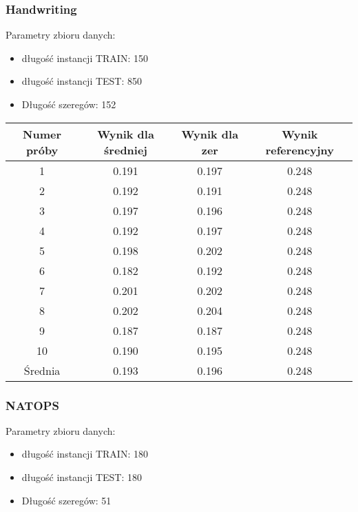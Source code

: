 \documentclass[12pt]{article}
\begin{document}
\subsubsection*{Handwriting}
Parametry zbioru danych:
\begin{itemize}
  \item długość instancji TRAIN: 150
  \item długość instancji TEST: 850
  \item Długość szeregów: 152
\end{itemize}

\begin{center}
\begin{tabular}{|c c c c|} 
 \hline
 Numer próby & Wynik dla średniej & Wynik dla zer & Wynik referencyjny \\ [0.5ex] 
 \hline\hline
 1 & 0.191 & 0.197 & 0.248 \\ 
 \hline
 2 & 0.192 & 0.191 & 0.248 \\
 \hline
 3 & 0.197 & 0.196 & 0.248 \\
 \hline
 4 & 0.192 & 0.197 & 0.248 \\
 \hline
  5 & 0.198 & 0.202 & 0.248 \\
 \hline
  6 & 0.182 & 0.192 & 0.248 \\
 \hline
  7 & 0.201 & 0.202 & 0.248 \\
 \hline
  8 & 0.202 & 0.204 & 0.248 \\
 \hline
  9 & 0.187 & 0.187 & 0.248 \\
 \hline
  10 & 0.190 & 0.195 & 0.248 \\
 \hline
 Średnia & 0.193 & 0.196 & 0.248 \\
 \hline
\end{tabular}
\end{center}

\subsubsection*{NATOPS}
Parametry zbioru danych:
\begin{itemize}
  \item długość instancji TRAIN: 180
  \item długość instancji TEST: 180
  \item Długość szeregów: 51
\end{itemize}
\end{document}
